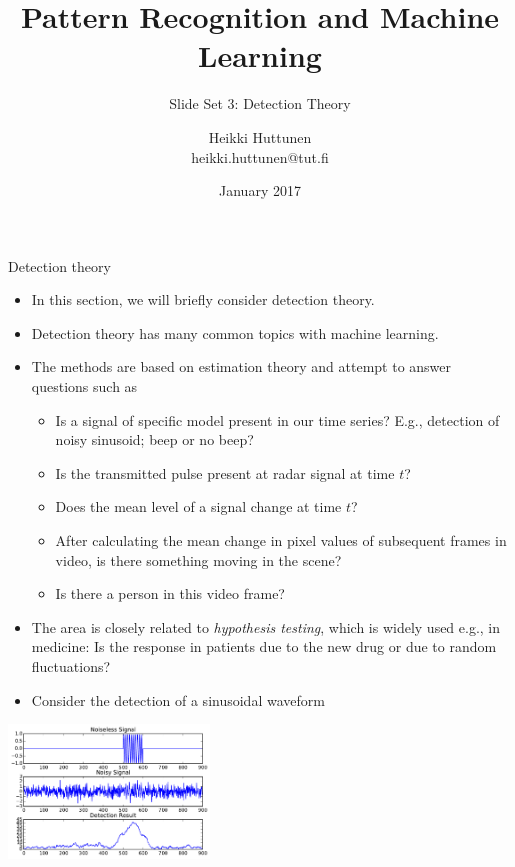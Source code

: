 \documentclass[10pt, aspectratio=169]{beamer} %
\title{Pattern Recognition and Machine Learning}
\subtitle{Slide Set 3: Detection Theory}
\author{Heikki Huttunen\\
heikki.huttunen@tut.fi}
\institute{Department of Signal Processing\\Tampere University of Technology}
\date{January 2017}
\begin{document}
\maketitle


\lstset{language=Python,style=mystyle} 

\begin{frame}[allowframebreaks=0.8]
 {Detection theory}
\begin{itemize}
\item In this section, we will briefly consider
detection theory.
\item Detection theory has many common topics with machine learning.
\item The methods are based on estimation theory and attempt
to answer questions such as
\begin{itemize}
\item Is a signal of specific model present in our time series?
E.g., detection of noisy sinusoid; beep or no beep?
\item Is the transmitted pulse present at radar signal at time $t$?
\item Does the mean level of a signal change at time $t$?
\item After calculating the mean change in pixel values of subsequent
frames in video, is there something moving in the scene?
\item Is there a person in this video frame?
\end{itemize}
\item The area is closely related to \emph{hypothesis testing}, which
is widely used e.g., in medicine: Is the response in patients due
to the new drug or due to random fluctuations?
\item Consider the detection of a sinusoidal waveform
\end{itemize}
\centerline{\includegraphics[width=0.4\textwidth]{rayleighSinusoid.pdf}}
\end{frame}
\end{document}
